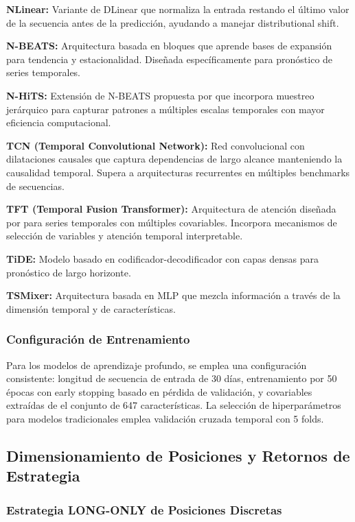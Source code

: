 \documentclass[11pt,a4paper]{article}
\begin{document}
\textbf{NLinear:} Variante de DLinear que normaliza la entrada restando el último valor de la secuencia antes de la predicción, ayudando a manejar distributional shift.

\textbf{N-BEATS:} Arquitectura basada en bloques que aprende bases de expansión para tendencia y estacionalidad. Diseñada específicamente para pronóstico de series temporales.

\textbf{N-HiTS:} Extensión de N-BEATS propuesta por \citet{challu2023} que incorpora muestreo jerárquico para capturar patrones a múltiples escalas temporales con mayor eficiencia computacional.

\textbf{TCN (Temporal Convolutional Network):} Red convolucional con dilataciones causales \citep{bai2018} que captura dependencias de largo alcance manteniendo la causalidad temporal. Supera a arquitecturas recurrentes en múltiples benchmarks de secuencias.

\textbf{TFT (Temporal Fusion Transformer):} Arquitectura de atención diseñada por \citet{lim2021} para series temporales con múltiples covariables. Incorpora mecanismos de selección de variables y atención temporal interpretable.

\textbf{TiDE:} Modelo basado en codificador-decodificador con capas densas para pronóstico de largo horizonte.

\textbf{TSMixer:} Arquitectura basada en MLP que mezcla información a través de la dimensión temporal y de características.

\subsubsection{Configuración de Entrenamiento}

Para los modelos de aprendizaje profundo, se emplea una configuración consistente: longitud de secuencia de entrada de 30 días, entrenamiento por 50 épocas con early stopping basado en pérdida de validación, y covariables extraídas de el conjunto de 647 características. La selección de hiperparámetros para modelos tradicionales emplea validación cruzada temporal con 5 folds.

\subsection{Dimensionamiento de Posiciones y Retornos de Estrategia}

\subsubsection{Estrategia LONG-ONLY de Posiciones Discretas}
\end{document}
